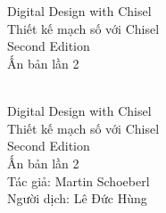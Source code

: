 \documentclass[%
    10pt,
    headinclude, footexclude,
    openright, %
    notitlepage,
    cleardoubleempty,
    headsepline,
    pointlessnumbers,
    bibtotoc, idxtotoc,
    ]{scrbook}
\newif\ifbook
\begin{document}
\ifbook
\else

\newpage
\thispagestyle{empty}
~
\newpage
\fi



\begin{flushleft}
\pagestyle{empty}
\ \\
\vspace{1cm}
{\mdseries\huge Digital Design with Chisel \\
Thiết kế mạch số với Chisel}
\ \\
\vspace{1cm}
{\mdseries\Large Second Edition \\
Ấn bản lần 2}
\cleardoublepage
\end{flushleft}
\newpage


\begin{flushleft}
\pagestyle{empty}
\ \\
\vspace{1cm}
{\Huge Digital Design with Chisel\\
Thiết kế mạch số với Chisel \\
\bigskip
{\huge Second Edition}\\
{\huge Ấn bản lần 2}\\
\bigskip
\bigskip
\bigskip
\bigskip
\bigskip
{\huge Tác giả: Martin Schoeberl}\\
{\huge Người dịch: Lê Đức Hùng}
\medskip\\

}

\newpage
\end{flushleft}
\end{document}
